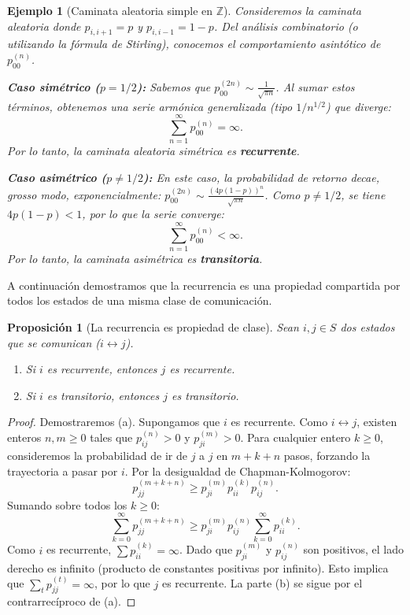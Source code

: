 \documentclass[12pt]{book}
\newtheorem{proposition}{Proposición}[chapter]
\newtheorem{example}{Ejemplo}[chapter]
\begin{document}

\begin{example}[Caminata aleatoria simple en $\mathbb{Z}$]
Consideremos la caminata aleatoria donde $p_{i,i+1}=p$ y $p_{i,i-1}=1-p$.
Del análisis combinatorio (o utilizando la fórmula de Stirling), conocemos el comportamiento asintótico de $p_{00}^{(n)}$.

\textbf{Caso simétrico ($p=1/2$):}
Sabemos que $p_{00}^{(2n)} \sim \frac{1}{\sqrt{\pi n}}$.
Al sumar estos términos, obtenemos una serie armónica generalizada (tipo $1/n^{1/2}$) que diverge:
\[
\sum_{n=1}^\infty p_{00}^{(n)} = \infty.
\]
Por lo tanto, la caminata aleatoria simétrica es \textbf{recurrente}.

\textbf{Caso asimétrico ($p \neq 1/2$):}
En este caso, la probabilidad de retorno decae, grosso modo, exponencialmente: $p_{00}^{(2n)} \sim \frac{(4p(1-p))^n}{\sqrt{\pi n}}$. Como $p \neq 1/2$, se tiene $4p(1-p) < 1$, por lo que la serie converge:
\[
\sum_{n=1}^\infty p_{00}^{(n)} < \infty.
\]
Por lo tanto, la caminata asimétrica es \textbf{transitoria}.
\end{example}

A continuación demostramos que la recurrencia es una propiedad compartida por todos los estados de una misma clase de comunicación.

\begin{proposition}[La recurrencia es propiedad de clase]
Sean $i, j \in S$ dos estados que se comunican ($i \leftrightarrow j$).
\begin{enumerate}
    \item[(a)] Si $i$ es recurrente, entonces $j$ es recurrente.
    \item[(b)] Si $i$ es transitorio, entonces $j$ es transitorio.
\end{enumerate}
\end{proposition}

\begin{proof}
Demostraremos (a). Supongamos que $i$ es recurrente. Como $i \leftrightarrow j$, existen enteros $n, m \ge 0$ tales que $p_{ij}^{(n)} > 0$ y $p_{ji}^{(m)} > 0$.
Para cualquier entero $k \ge 0$, consideremos la probabilidad de ir de $j$ a $j$ en $m+k+n$ pasos, forzando la trayectoria a pasar por $i$. Por la desigualdad de Chapman-Kolmogorov:
\[
p_{jj}^{(m+k+n)} \ge p_{ji}^{(m)} p_{ii}^{(k)} p_{ij}^{(n)}.
\]
Sumando sobre todos los $k \ge 0$:
\[
\sum_{k=0}^\infty p_{jj}^{(m+k+n)} \ge p_{ji}^{(m)} p_{ij}^{(n)} \sum_{k=0}^\infty p_{ii}^{(k)}.
\]
Como $i$ es recurrente, $\sum p_{ii}^{(k)} = \infty$. Dado que $p_{ji}^{(m)}$ y $p_{ij}^{(n)}$ son positivos, el lado derecho es infinito (producto de constantes positivas por infinito). Esto implica que $\sum_{t} p_{jj}^{(t)} = \infty$, por lo que $j$ es recurrente.
La parte (b) se sigue por el contrarrecíproco de (a).
\end{proof}
\end{document}
